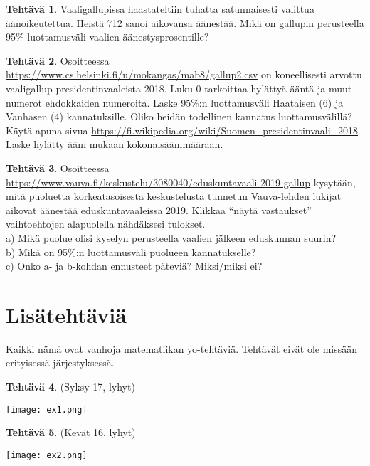 \documentclass[12pt,leqno,a4paper,oneside]{amsart}
\theoremstyle{definition}
\newtheorem{exercise}{Tehtävä}
\theoremstyle{remark}
\numberwithin{equation}{section}
\begin{document}
\begin{exercise}
 Vaaligallupissa haastateltiin tuhatta satunnaisesti valittua äänoikeutettua. Heistä 712 sanoi aikovansa äänestää.
 Mikä on gallupin perusteella 95\% luottamusväli
 vaalien äänestysprosentille?
\end{exercise}

\begin{exercise}
 Osoitteessa \url{https://www.cs.helsinki.fi/u/mokangas/mab8/gallup2.csv} on koneellisesti arvottu vaaligallup presidentinvaaleista 2018.
 Luku 0 tarkoittaa hylättyä ääntä ja muut numerot ehdokkaiden numeroita. Laske 95\%:n luottamusväli Haataisen (6) ja Vanhasen (4) kannatuksille. 
 Oliko heidän todellinen kannatus luottamusvälillä? Käytä apuna sivua \url{https://fi.wikipedia.org/wiki/Suomen_presidentinvaali_2018}
 Laske hylätty ääni mukaan kokonaisäänimäärään.
\end{exercise}


\begin{exercise}
 Osoitteessa \url{https://www.vauva.fi/keskustelu/3080040/eduskuntavaali-2019-gallup} kysytään, mitä puoluetta 
 korkea\-tasoi\-ses\-ta keskustelusta tunnetun Vauva-lehden lukijat aikovat äänestää eduskuntavaaleissa 2019.
 Klikkaa ``näytä vastaukset'' vaihtoehtojen alapuolella nähdäksesi tulokset.\\
 a) Mikä puolue olisi kyselyn perusteella vaalien jälkeen eduskunnan suurin?\\
 b) Mikä on 95\%:n luottamusväli puolueen kannatukselle?\\
 c) Onko a- ja b-kohdan ennusteet päteviä? Miksi/miksi ei?
\end{exercise}


\section{Lisätehtäviä}

Kaikki nämä ovat vanhoja matematiikan yo-tehtäviä. Tehtävät eivät ole missään erityisessä järjestyksessä.

\begin{exercise}
 (Syksy 17, lyhyt)
 
 \texttt{[image: ex1.png]}
\end{exercise}


\begin{exercise}
 (Kevät 16, lyhyt)
 
 \texttt{[image: ex2.png]}
\end{exercise}
\end{document}
